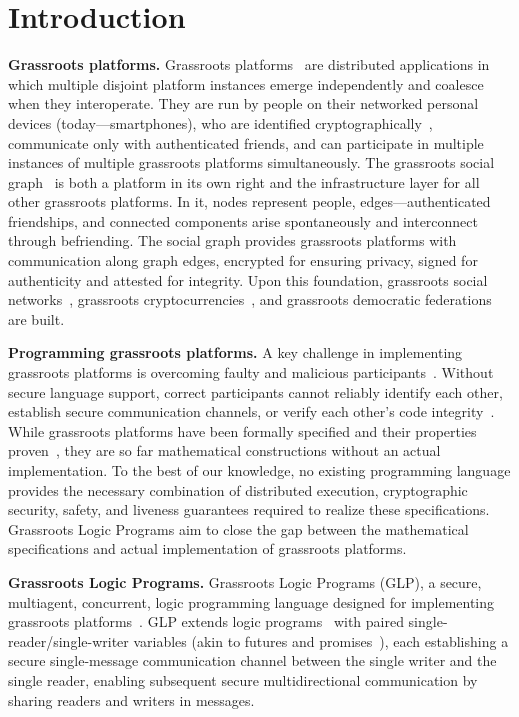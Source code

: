 \documentclass[runningheads,thm-restate]{llncs}
\newcommand{\mypara}[1]{\smallskip\noindent\textbf{#1.}}
\begin{document}
\section{Introduction}
\mypara{Grassroots platforms} Grassroots platforms~\cite{shapiro2023grassrootsBA} are distributed applications in which multiple disjoint platform instances emerge independently and coalesce when they interoperate. They are run by people on their networked personal devices (today—smartphones), who are identified cryptographically~\cite{rivest1978method}, communicate only with authenticated friends, and can participate in multiple instances of multiple grassroots platforms simultaneously. The grassroots social graph~\cite{shapiro2023gsn} is both a platform in its own right and the infrastructure layer for all other grassroots platforms. In it, nodes represent people, edges—authenticated friendships, and connected components arise spontaneously and interconnect through befriending. The social graph provides grassroots platforms with communication along graph edges, encrypted for ensuring privacy, signed for authenticity and attested for integrity. Upon this foundation, grassroots social networks~\cite{shapiro2023gsn}, grassroots cryptocurrencies~\cite{shapiro2024gc}, and grassroots democratic federations~\cite{shapiro2025GF} are built.


\mypara{Programming grassroots platforms}  A key challenge in implementing grassroots platforms is overcoming faulty and malicious participants~\cite{lamport1982byzantine}. Without secure language support, correct participants cannot reliably identify each other, establish secure communication channels, or verify each other's code integrity~\cite{sabt2015trusted,costan2016intel}. 
While grassroots platforms have been formally specified and their properties  proven~\cite{shapiro2023grassrootsBA,shapiro2023gsn,shapiro2024gc,shapiro2025GF,shapiro2025atomic}, they are so far mathematical constructions without an actual implementation. To the best of our knowledge, no existing programming language provides the necessary combination of distributed execution, cryptographic security, safety, and liveness guarantees required to realize these specifications. Grassroots Logic Programs aim to close the gap between the mathematical specifications and actual implementation of grassroots platforms.



\mypara{Grassroots Logic Programs}  Grassroots Logic Programs (GLP), a secure, multiagent, concurrent, logic programming language designed for implementing grassroots platforms~\cite{shapiro2025glp}. 
GLP extends logic programs~\cite{lloyd1987foundations,sterling1994art} with paired single-reader/single-writer variables (akin to futures and promises~\cite{dauth2019futures,azadbakht2020formal}), each establishing a secure single-message communication channel between the single writer and the single reader, enabling subsequent secure multidirectional communication by sharing readers and writers in messages.
\end{document}
